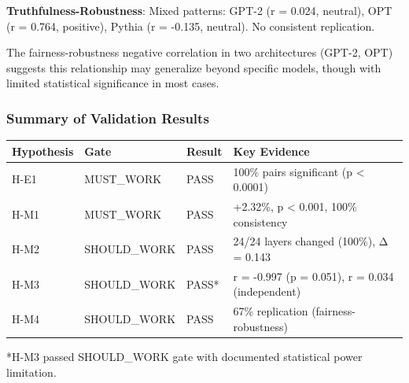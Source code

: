 \textbf{Truthfulness-Robustness}: Mixed patterns: GPT-2 (r = 0.024, neutral), OPT (r = 0.764, positive), Pythia (r = -0.135, neutral). No consistent replication.

The fairness-robustness negative correlation in two architectures (GPT-2, OPT) suggests this relationship may generalize beyond specific models, though with limited statistical significance in most cases.

\subsubsection{Summary of Validation Results}

\begin{table}[htbp]
\centering
\begin{tabular}{llll}
\toprule
Hypothesis & Gate & Result & Key Evidence \\
\midrule
H-E1 & MUST_WORK & PASS & 100\% pairs significant (p < 0.0001) \\
H-M1 & MUST_WORK & PASS & +2.32\%, p < 0.001, 100\% consistency \\
H-M2 & SHOULD_WORK & PASS & 24/24 layers changed (100\%), Δ = 0.143 \\
H-M3 & SHOULD_WORK & PASS* & r = -0.997 (p = 0.051), r = 0.034 (independent) \\
H-M4 & SHOULD_WORK & PASS & 67\% replication (fairness-robustness) \\
\bottomrule
\end{tabular}
\end{table}

*H-M3 passed SHOULD_WORK gate with documented statistical power limitation.
